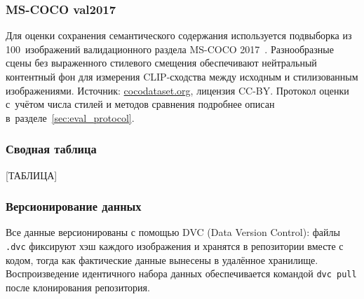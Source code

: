 \subsubsection*{MS-COCO val2017}

Для оценки сохранения семантического содержания используется подвыборка из
100~изображений валидационного раздела MS-COCO 2017~\cite{lin2014coco}.
Разнообразные сцены без выраженного стилевого смещения обеспечивают нейтральный
контентный фон для измерения CLIP-сходства между исходным и стилизованным
изображениями. Источник: \url{cocodataset.org}, лицензия CC-BY. Протокол оценки
с~учётом числа стилей и методов сравнения подробнее описан в~разделе~\ref{sec:eval_protocol}.

\subsubsection*{Сводная таблица}

[ТАБЛИЦА]

\subsubsection*{Версионирование данных}

Все данные версионированы с помощью DVC (Data Version Control): файлы \texttt{.dvc}
фиксируют хэш каждого изображения и хранятся в репозитории вместе с кодом, тогда
как фактические данные вынесены в удалённое хранилище. Воспроизведение идентичного
набора данных обеспечивается командой \texttt{dvc pull} после клонирования репозитория.
